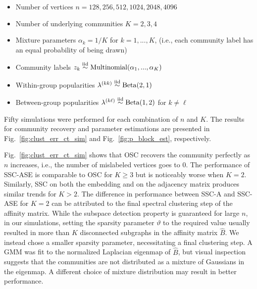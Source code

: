 \documentclass[12pt]{article}
\providecommand{\tightlist}{%
  \setlength{\itemsep}{0pt}\setlength{\parskip}{0pt}}
\begin{document}
\begin{itemize}
\tightlist
\item
  Number of vertices \(n = 128, 256, 512, 1024, 2048, 4096\)
\item
  Number of underlying communities \(K = 2, 3, 4\)
\item
  Mixture parameters \(\alpha_k = 1 / K\) for \(k = 1, ..., K\), (i.e.,
  each community label has an equal probability of being drawn)
\item
  Community labels
  \(z_k \stackrel{\text{iid}}{\sim} \mathrm{Multinomial}(\alpha_1, ..., \alpha_K)\)
\item
  Within-group popularities
  \(\lambda^{(kk)} \stackrel{\text{iid}}{\sim} \mathrm{Beta}(2, 1)\)
\item
  Between-group popularities
  \(\lambda^{(k \ell)} \stackrel{\text{iid}}{\sim} \mathrm{Beta}(1, 2)\) for
  \(k \neq \ell\)
\end{itemize}
Fifty simulations were performed for each combination of $n$ and
$K$. The results for community recovery and parameter estimations are
presented in Fig.~\ref{fig:clust_err_ct_sim} and
Fig.~\ref{fig:p_block_est}, respectively.

Fig.~\ref{fig:clust_err_ct_sim} shows that OSC recovers the community
perfectly as $n$ increases, i.e., the number of mislabeled vertices
goes to $0$. The performance of SSC-ASE is comparable to OSC for $K
\geq 3$ but is noticeably worse when $K = 2$. Similarly, SSC on both the embedding and on the
adjacency matrix produces similar trends for \(K > 2\). The difference
in performance between SSC-A and SSC-ASE for \(K = 2\) can be attributed to the final spectral
clustering step of the affinity matrix. While the subspace detection
property is guaranteed for large $n$, in our simulations, setting the
sparsity parameter $\vartheta$ to the required value usually resulted
in more than $K$ disconnected subgraphs in the affinity matrix
$\hat{B}$.  
We instead chose a smaller sparsity parameter, 
necessitating a final clustering step. 
A GMM was fit to the normalized Laplacian eigenmap of $\hat{B}$,
but visual inspection suggests that the communities are not
distributed as a mixture of Gaussians in the eigenmap. 
A different choice of mixture distribution may result in better performance. 
\end{document}
